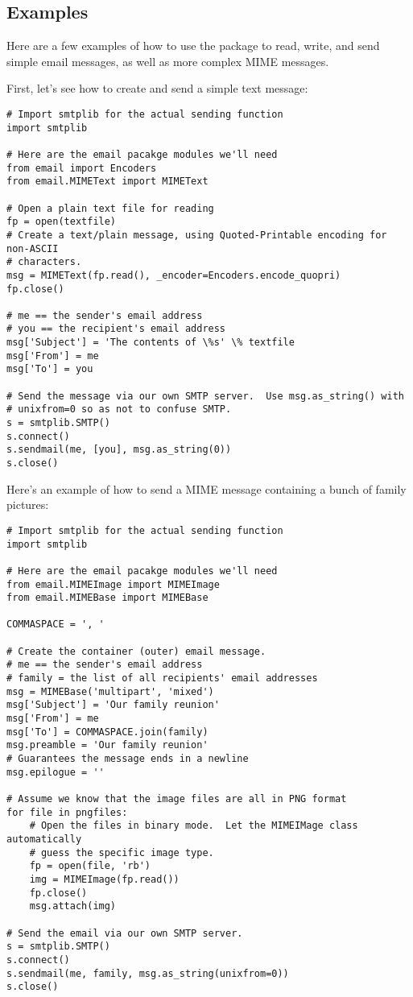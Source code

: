 \subsection{Examples}

Here are a few examples of how to use the  package to
read, write, and send simple email messages, as well as more complex
MIME messages.

First, let's see how to create and send a simple text message:

\begin{verbatim}
# Import smtplib for the actual sending function
import smtplib

# Here are the email pacakge modules we'll need
from email import Encoders
from email.MIMEText import MIMEText

# Open a plain text file for reading
fp = open(textfile)
# Create a text/plain message, using Quoted-Printable encoding for non-ASCII
# characters.
msg = MIMEText(fp.read(), _encoder=Encoders.encode_quopri)
fp.close()

# me == the sender's email address
# you == the recipient's email address
msg['Subject'] = 'The contents of \%s' \% textfile
msg['From'] = me
msg['To'] = you

# Send the message via our own SMTP server.  Use msg.as_string() with
# unixfrom=0 so as not to confuse SMTP.
s = smtplib.SMTP()
s.connect()
s.sendmail(me, [you], msg.as_string(0))
s.close()
\end{verbatim}

Here's an example of how to send a MIME message containing a bunch of
family pictures:

\begin{verbatim}
# Import smtplib for the actual sending function
import smtplib

# Here are the email pacakge modules we'll need
from email.MIMEImage import MIMEImage
from email.MIMEBase import MIMEBase

COMMASPACE = ', '

# Create the container (outer) email message.
# me == the sender's email address
# family = the list of all recipients' email addresses
msg = MIMEBase('multipart', 'mixed')
msg['Subject'] = 'Our family reunion'
msg['From'] = me
msg['To'] = COMMASPACE.join(family)
msg.preamble = 'Our family reunion'
# Guarantees the message ends in a newline
msg.epilogue = ''

# Assume we know that the image files are all in PNG format
for file in pngfiles:
    # Open the files in binary mode.  Let the MIMEIMage class automatically
    # guess the specific image type.
    fp = open(file, 'rb')
    img = MIMEImage(fp.read())
    fp.close()
    msg.attach(img)

# Send the email via our own SMTP server.
s = smtplib.SMTP()
s.connect()
s.sendmail(me, family, msg.as_string(unixfrom=0))
s.close()
\end{verbatim}

